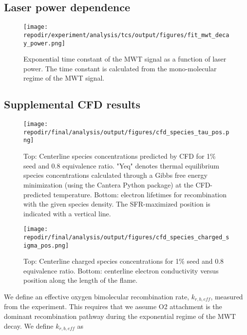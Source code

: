 \subsection{Laser power dependence}

\begin{figure}
    \centering
    \texttt{[image: \\repodir/experiment/analysis/tcs/output/figures/fit\_mwt\_decay\_power.png]} 
    \caption{Exponential time constant of the MWT signal as a function of laser power. The time constant is calculated from the mono-molecular regime of the MWT signal.}
    \label{fig:SI_fit_mwt_decay_power}
\end{figure}

\clearpage

\subsection{Supplemental CFD results}

\begin{figure}[h]
    \texttt{[image: \\repodir/final/analysis/output/figures/cfd\_species\_tau\_pos.png]} 
    \caption{Top: Centerline species concentrations predicted by CFD for 1\% seed and 0.8 equivalence ratio. "Yeq" denotes thermal equilibrium species concentrations calculated through a Gibbs free energy minimization (using the Cantera Python package) at the CFD-predicted temperature.  Bottom: electron lifetimes for recombination with the given species density. The SFR-maximized position is indicated with a vertical line.}
    \label{fig:SI_cfd_species_tau_pos}
\end{figure}



\begin{figure}[h]
    \texttt{[image: \\repodir/final/analysis/output/figures/cfd\_species\_charged\_sigma\_pos.png]} 
    \caption{Top: Centerline charged species concentrations for 1\% seed and 0.8 equivalence ratio. Bottom: centerline electron conductivity versus position along the length of the flame.}
    \label{fig:SI_cfd_species_charged_sigma_pos}
\end{figure}



\clearpage

We define an effective oxygen bimolecular recombination rate, $k_{r,b,eff}$, measured from the experiment. This requires that we assume O2 attachment is the dominant recombination pathway during the exponential regime of the MWT decay. We define $k_{r,b,eff}$ as 

